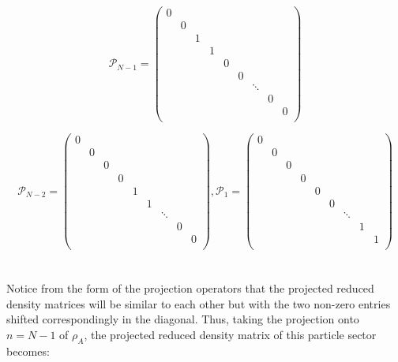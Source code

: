 \begin{equation}
\mathcal{P}_{N-1} = \begin{pmatrix} 
0 \\
& 0 \\
& & 1 \\
& & & 1 \\
& & & &  0 \\
& & & & & 0 \\
& & & & &  & \ddots \\
& & & & & & &  0 \\
& & & & & & & &  0 \\
\end{pmatrix}
\nonumber
\end{equation}

\begin{equation}
\mathcal{P}_{N-2} = \begin{pmatrix} 
0 \\
& 0 \\
& & 0 \\
& & & 0 \\
& & & &  1 \\
& & & & & 1 \\
& & & & &  & \ddots \\
& & & & & & &  0 \\
& & & & & & & &  0 \\
\end{pmatrix}
,
\mathcal{P}_{1} = \begin{pmatrix} 
0 \\
& 0 \\
& & 0 \\
& & & 0 \\
& & & &  0 \\
& & & & & 0 \\
& & & & & & \ddots \\
& & & & & & &  1 \\
& & & & & & & &  1 \\
\end{pmatrix}
\end{equation} \\
\\

Notice from the form of the projection operators that the projected reduced density matrices will be similar to each other but with the two non-zero entries shifted correspondingly in the diagonal. Thus, taking the projection onto $n=N-1$ of $\rho_{A}$, the projected reduced density matrix of this particle sector becomes:

